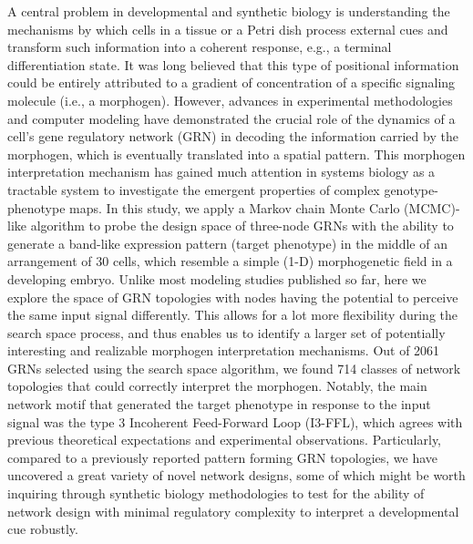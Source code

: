 \documentclass[10pt,letterpaper]{article}
\begin{document}
A central problem in developmental and synthetic biology is understanding the
mechanisms by which cells in a tissue or a Petri dish process external cues
and transform such information into a coherent response, e.g., a terminal
differentiation state. It was long believed that this type of positional
information could be entirely attributed to a gradient of concentration of a
specific signaling molecule (i.e., a morphogen). However, advances in experimental
methodologies and computer modeling have demonstrated the crucial role of the
dynamics of a cell's gene regulatory network (GRN) in decoding the information
carried by the morphogen, which is eventually translated into a spatial
pattern. This morphogen interpretation mechanism has gained much attention
in systems biology as a tractable system to investigate the emergent properties
of complex genotype-phenotype maps. In this study, we apply a Markov chain
Monte Carlo (MCMC)-like algorithm to probe
the design space of three-node GRNs with the ability to generate a band-like
expression pattern (target phenotype) in the middle of an arrangement of 30
cells, which resemble a simple (1-D) morphogenetic field in a developing embryo.
Unlike most modeling studies published so far, here we explore the
space of GRN topologies with nodes having the potential to perceive
the same input signal differently. This allows for a lot more flexibility during the search
space process, and thus enables us to identify a larger set of potentially
interesting and realizable morphogen interpretation mechanisms.
Out of 2061 GRNs selected using the search space algorithm, we found 714 classes of
network topologies that could correctly interpret the morphogen.
Notably, the main network motif that generated the target phenotype in
response to the input signal was the type 3 Incoherent Feed-Forward Loop (I3-FFL),
which agrees with previous theoretical expectations and experimental
observations. Particularly, compared to a previously reported pattern forming GRN
topologies, we have uncovered a great variety of novel network designs, some of
which might be worth inquiring through synthetic biology methodologies to test
for the ability of network design with minimal regulatory complexity to
interpret a developmental cue robustly.



\end{document}
